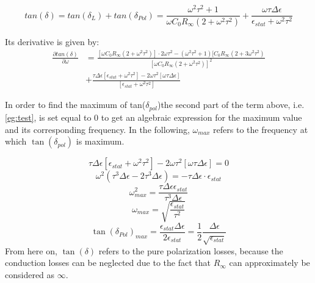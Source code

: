 \begin{equation}
tan(\delta) = tan(\delta_L) + tan( \delta_{Pol}) = \frac{\omega^2 \tau^2+1}{\omega C_0 R_\infty (2+ \omega^2 \tau^2)}+\frac{\omega \tau \Delta \epsilon}{\epsilon_{stat} + \omega^2 \tau^2}
\end{equation}

Its derivative is given by: 
\begin{align}
\frac{\partial tan(\delta)}{ \partial \omega} & = \frac{[\omega C_0 R_\infty (2+\omega^2 \tau^2)]\cdot 2 \omega \tau^2 - (\omega^2 \tau^2 +1) [C_0 R_\infty (2+3 \omega^2 \tau^2)  }{[\omega C_0 R_\infty (2+\omega^2 \tau^2)]^2}\\
					      & + \frac{\tau \Delta \epsilon [\epsilon_{stat} + \omega^2 \tau^2] - 2 \omega \tau^2 [\omega \tau \Delta \epsilon]}{[\epsilon_{stat} +\omega^2 \tau^2]}
\label{eg:test}
					      \end{align}

In order to find the maximum of tan($\delta_{pol}$)the second part of the term above, i.e. \eqref{eg:test}, is set equal to 0 to get an algebraic expression for the maximum value and its corresponding frequency. In the following, $\omega_{max}$ refers to the frequency at which $\tan(\delta_{pol})$ is maximum.

\begin{equation}
\tau \Delta \epsilon [\epsilon_{stat} + \omega^2 \tau^2] -2\omega \tau^2 [\omega \tau \Delta \epsilon] = 0
\end{equation}
\begin{equation}
\omega^2 (\tau^3 \Delta \epsilon -2 \tau^3 \Delta \epsilon) = - \tau \Delta \epsilon \cdot \epsilon_{stat}
\end{equation}
\begin{equation}
\omega_{max}^2 = \frac{\tau \Delta \epsilon \epsilon_{stat}}{\tau^3 \Delta \epsilon}
\end{equation}
\begin{equation}
\omega_{max} = \sqrt{\frac{\epsilon_{stat}}{\tau^2}}
\end{equation}
\begin{equation}
\tan(\delta_{Pol})_{max} = \frac{\epsilon_{stat} \Delta\epsilon}{2\epsilon_{stat}} = \frac{1}{2} \frac{\Delta \epsilon}{\sqrt{\epsilon_{stat}}}
\end{equation}
From here on, $\tan(\delta)$ refers to the pure polarization losses, because the conduction losses can be neglected due to the fact that $R_{\infty}$ can approximately be considered as $\infty$. 

